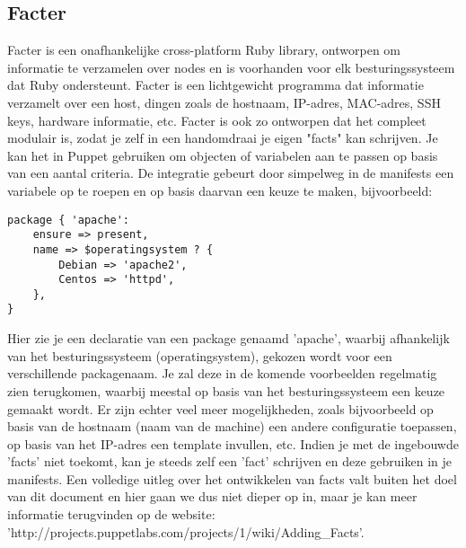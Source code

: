 \subsection{Facter}
Facter is een onafhankelijke cross-platform Ruby library, ontworpen om informatie te verzamelen over nodes en is voorhanden voor elk besturingssysteem dat Ruby ondersteunt. Facter is een lichtgewicht programma dat informatie verzamelt over een host, dingen zoals de hostnaam, IP-adres, MAC-adres, SSH keys, hardware informatie, etc. Facter is ook zo ontworpen dat het compleet modulair is, zodat je zelf in een handomdraai je eigen "facts" kan schrijven. Je kan het in Puppet gebruiken om objecten of variabelen aan te passen op basis van een aantal criteria. De integratie gebeurt door simpelweg in de manifests een variabele op te roepen en op basis daarvan een keuze te maken, bijvoorbeeld:
\begin{code}
\begin{lstlisting}
package { 'apache':
	ensure => present,
	name => $operatingsystem ? {
		Debian => 'apache2',
		Centos => 'httpd',
	},
}
\end{lstlisting}
\end{code}
Hier zie je een declaratie van een package genaamd 'apache', waarbij afhankelijk van het besturingssysteem (operatingsystem), gekozen wordt voor een verschillende packagenaam. Je zal deze in de komende voorbeelden regelmatig zien terugkomen, waarbij meestal op basis van het besturingssysteem een keuze gemaakt wordt. Er zijn echter veel meer mogelijkheden, zoals bijvoorbeeld op basis van de hostnaam (naam van de machine) een andere configuratie toepassen, op basis van het IP-adres een template invullen, etc. Indien je met de ingebouwde 'facts' niet toekomt, kan je steeds zelf een 'fact' schrijven en deze gebruiken in je manifests. Een volledige uitleg over het ontwikkelen van facts valt buiten het doel van dit document en hier gaan we dus niet dieper op in, maar je kan meer informatie terugvinden op de website:\\
'http://projects.puppetlabs.com/projects/1/wiki/Adding\_Facts'.

